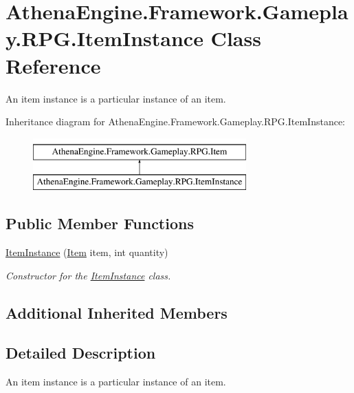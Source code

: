 \hypertarget{class_athena_engine_1_1_framework_1_1_gameplay_1_1_r_p_g_1_1_item_instance}{\section{Athena\-Engine.\-Framework.\-Gameplay.\-R\-P\-G.\-Item\-Instance Class Reference}
\label{class_athena_engine_1_1_framework_1_1_gameplay_1_1_r_p_g_1_1_item_instance}
}


An item instance is a particular instance of an item.  


Inheritance diagram for Athena\-Engine.\-Framework.\-Gameplay.\-R\-P\-G.\-Item\-Instance\-:\begin{figure}[H]
\begin{center}
\leavevmode
\includegraphics[height=2.000000cm]{class_athena_engine_1_1_framework_1_1_gameplay_1_1_r_p_g_1_1_item_instance}
\end{center}
\end{figure}
\subsection*{Public Member Functions}
\begin{DoxyCompactItemize}
\item 
\hyperlink{class_athena_engine_1_1_framework_1_1_gameplay_1_1_r_p_g_1_1_item_instance_af1e00aa364d12252382239020fc48cc1}{Item\-Instance} (\hyperlink{class_athena_engine_1_1_framework_1_1_gameplay_1_1_r_p_g_1_1_item}{Item} item, int quantity)
\begin{DoxyCompactList}\small\item\em Constructor for the \hyperlink{class_athena_engine_1_1_framework_1_1_gameplay_1_1_r_p_g_1_1_item_instance}{Item\-Instance} class. \end{DoxyCompactList}\end{DoxyCompactItemize}
\subsection*{Additional Inherited Members}


\subsection{Detailed Description}
An item instance is a particular instance of an item. 



